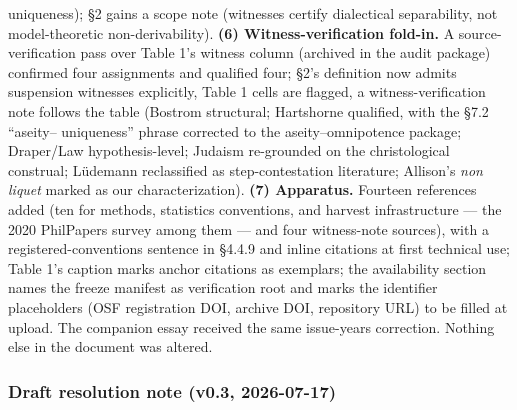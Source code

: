 uniqueness); \S{}2 gains a scope note (witnesses certify dialectical separability, not model-theoretic non-derivability). \textbf{(6) Witness-verification fold-in.} A source-verification pass over Table 1's witness column (archived in the audit package) confirmed four assignments and qualified four; \S{}2's definition now admits suspension witnesses explicitly, Table 1 cells are flagged, a witness-verification note follows the table (Bostrom structural; Hartshorne qualified, with the \S{}7.2 ``aseity-- uniqueness'' phrase corrected to the aseity--omnipotence package; Draper/Law hypothesis-level; Judaism re-grounded on the christological construal; Lüdemann reclassified as step-contestation literature; Allison's \emph{non liquet} marked as our characterization). \textbf{(7) Apparatus.} Fourteen references added (ten for methods, statistics conventions, and harvest infrastructure --- the 2020 PhilPapers survey among them --- and four witness-note sources), with a registered-conventions sentence in \S{}4.4.9 and inline citations at first technical use; Table 1's caption marks anchor citations as exemplars; the availability section names the freeze manifest as verification root and marks the identifier placeholders (OSF registration DOI, archive DOI, repository URL) to be filled at upload. The companion essay received the same issue-years correction. Nothing else in the document was altered.

\subsubsection{Draft resolution note (v0.3, 2026-07-17)}\label{draft-resolution-note-v0.3-2026-07-17}

